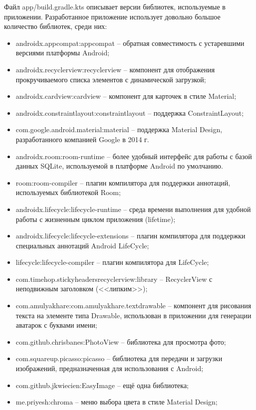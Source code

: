 Файл app/build.gradle.kts описывает версии библиотек, используемые в приложении. Разработанное приложение использует довольно большое количество библиотек, среди них:
\begin{itemize}
	\item androidx.appcompat:appcompat -- обратная совместимость с устаревшими версиями платформы Android;
	\item androidx.recyclerview:recyclerview -- компонент для отображения прокручиваемого списка элементов с динамической загрузкой;
    \item androidx.cardview:cardview -- компонент для карточек в стиле Material;
    \item androidx.constraintlayout:constraintlayout -- поддержка ConstraintLayout;
    \item com.google.android.material:material -- поддержка Material Design, разработанного компанией Google в 2014 г.
    \item androidx.room:room-runtime -- более удобный интерфейс для работы с базой данных SQLite, используемой в платформе Android по умолчанию.
    \item room:room-compiler -- плагин компилятора для поддержки аннотаций, используемых библиотекой Room;
	\item androidx.lifecycle:lifecycle-runtime -- среда времени выполнения для удобной работы с жизненным циклом приложения (lifetime);
    \item androidx.lifecycle:lifecycle-extensions -- плагин компилятора для поддержки специальных аннотаций Android LifeCycle;
    \item lifecycle:lifecycle-compiler -- плагин компилятора для LifeCycle;
	\item com.timehop.stickyheadersrecyclerview:library -- RecyclerView с неподвижным заголовком (<<липким>>);
    \item com.amulyakhare:com.amulyakhare.textdrawable -- компонент для рисования текста на элементе типа Drawable, использован в приложении для генерации аватарок с буквами имени;
    \item com.github.chrisbanes:PhotoView -- библиотека для просмотра фото;
    \item com.squareup.picasso:picasso -- библиотека для передачи и загрузки изображений, предназначенная для использования с Android;
    \item com.github.jkwiecien:EasyImage -- ещё одна библиотека;
    \item me.priyesh:chroma -- меню выбора цвета в стиле Material Design;

\end{itemize}
